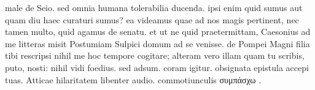 


male de Seio. sed omnia humana tolerabilia ducenda. ipsi enim quid sumus aut quam diu haec curaturi sumus? ea videamus quae ad nos magis pertinent, nec tamen multo, quid agamus de senatu. et ut ne quid praetermittam, Caesonius ad me litteras misit
              Postumiam
            Sulpici domum ad se venisse. de Pompei
            Magni filia tibi rescripsi nihil me hoc tempore cogitare; alteram vero
            illam quam tu scribis, puto, nosti: nihil vidi foedius. sed adsum. coram igitur. obsignata epistula accepi tuas.
              Atticae hilaritatem libenter audio. commotiunculis συμπάσχω .
